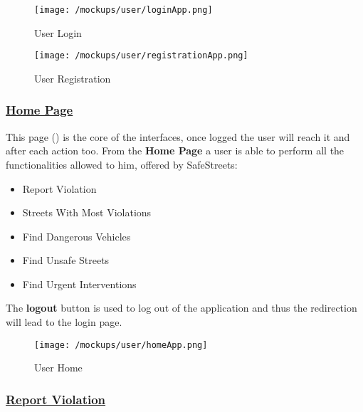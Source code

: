 			\vspace{0.6cm}
				
			\begin{figure}[ht!]
				\centering
				\begin{minipage}{0.5\textwidth}
					\centering
					\texttt{[image: /mockups/user/loginApp.png]}
					\caption{\label{fig:loginApp} User Login}
				\end{minipage}\hfill
				\begin{minipage}{0.5\textwidth}
					\centering
					\texttt{[image: /mockups/user/registrationApp.png]}
					\caption{\label{fig:registrationApp} User Registration}
				\end{minipage}
			\end{figure}
		
			\FloatBarrier
		\subsubsection[Home Page]{\hyperlink{toc}{Home Page}}
			\label{sec:userHomePage}
			
			This page () is the core of the interfaces, once logged the user will reach it and after each action too. From the \textbf{Home Page} a user is able to perform all the functionalities allowed to him, offered by SafeStreets:
			
			\begin{itemize}
				\item Report Violation
				\item Streets With Most Violations
				\item Find Dangerous Vehicles
				\item Find Unsafe Streets
				\item Find Urgent Interventions
			\end{itemize}
		
			The \textbf{logout} button is used to log out of the application and thus the redirection will lead to the login page.\\
			
			\begin{figure}[ht!]
				\centering
				\texttt{[image: /mockups/user/homeApp.png]}
				\caption{\label{fig:homeApp} User Home}
			\end{figure}
		
			\FloatBarrier

		\subsubsection[Report Violation]{\hyperlink{toc}{Report Violation}}
			\label{sec:userReportViolation}
			
